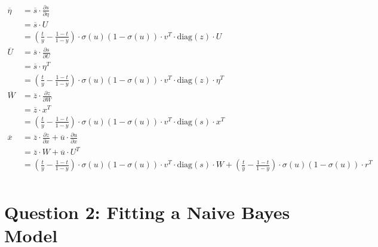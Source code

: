 \documentclass{article}
\begin{document}
\begin{enumerate}[(a)]
    \begin{align*}
        \overline{\eta} &= \overline{s} \cdot \frac{\partial s}{\partial \eta}  \\
        &= \overline{s} \cdot U\\
        &= \left(\frac{t}{y} - \frac{1 - t}{1 - y}\right) \cdot \sigma(u) (1 - \sigma(u)) \cdot v^T \cdot \text{diag}(z) \cdot U\\[1em]
        \overline{U} &= \overline{s} \cdot \frac{\partial s}{\partial U}  \\
        &= \overline{s} \cdot \eta^T\\
        &= \left(\frac{t}{y} - \frac{1 - t}{1 - y}\right) \cdot \sigma(u) (1 - \sigma(u)) \cdot v^T \cdot \text{diag}(z) \cdot \eta^T\\[1em]
        \overline{W} &= \overline{z} \cdot \frac{\partial z}{\partial W}  \\
        &= \overline{z} \cdot x^T\\
        &= \left(\frac{t}{y} - \frac{1 - t}{1 - y}\right) \cdot \sigma(u) (1 - \sigma(u)) \cdot v^T \cdot \text{diag}(s) \cdot x^T\\[1em]
        \overline{x} &= \overline{z} \cdot \frac{\partial z}{\partial x} + \overline{u} \cdot \frac{\partial u}{\partial x}\\
        &= \overline{z} \cdot W + \overline{u} \cdot U^T\\
        &= \left(\frac{t}{y} - \frac{1 - t}{1 - y}\right) \cdot \sigma(u) (1 - \sigma(u)) \cdot v^T \cdot \text{diag}(s) \cdot W + \left(\frac{t}{y} - \frac{1 - t}{1 - y}\right) \cdot \sigma(u) (1 - \sigma(u)) \cdot r^T\\[1em]
    \end{align*}
    

\end{enumerate}



\newpage 
\section*{Question 2: Fitting a Naive Bayes Model}
\end{document}
